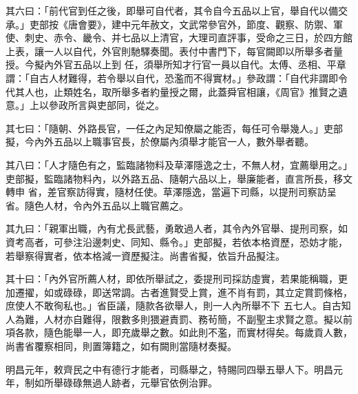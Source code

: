 \begin{pinyinscope}
 其六曰：「前代官到任之後，即舉可自代者，其令自今五品以上官，舉自代以備交承。」吏部按《唐會要》，建中元年赦文，文武常參官外，節度、觀察、防禦、軍使、刺史、赤令、畿令、并七品以上清官，大理司直評事，受命之三日，於四方館上表，讓一人以自代，外官則馳驛奏聞。表付中書門下，每官闕即以所舉多者量授。今擬內外官五品以上到
 任，須舉所知才行官一員以自代。太傅、丞相、平章謂：「自古人材難得，若令舉以自代，恐濫而不得實材。」參政謂：「自代非謂即令代其人也，止類姓名，取所舉多者約量授之爾，此蓋舜官相讓，《周官》推賢之遺意。」上以參政所言與吏部同，從之。



 其七曰：「隨朝、外路長官，一任之內足知僚屬之能否，每任可令舉幾人。」吏部擬，今內外五品以上職事官長，於僚屬內須舉才能官一人，數外舉者聽。



 其八曰：「人才隨色有之，監臨諸物料及草澤隱逸之士，不無人材，宜薦舉用之。」吏部擬，監臨諸物料內，以外路五品、隨朝六品以上，舉廉能者，直言所長，移文轉申
 省，差官察訪得實，隨材任使。草澤隱逸，當遍下司縣，以提刑司察訪呈省。隨色人材，令內外五品以上職官薦之。



 其九曰：「親軍出職，內有尤長武藝，勇敢過人者，其令內外官舉、提刑司察，如資考高者，可參注沿邊刺史、同知、縣令。」吏部擬，若依本格資歷，恐妨才能，若舉察得實者，依本格減一資歷擬注。尚書省擬，依旨升品擬注。



 其十曰：「內外官所薦人材，即依所舉試之，委提刑司採訪虛實，若果能稱職，更加遷擢，如或碌碌，即送常調。古者進賢受上賞，進不肖有罰，其立定賞罰條格，庶使人不敢徇私也。」省臣議，隨款各欲舉人，則一人內所舉不下
 五七人。自古知人為難，人材亦自難得，限數多則猥避責罰、務茍簡，不副聖主求賢之意。擬以前項各款，隨色能舉一人，即充歲舉之數。如此則不濫，而實材得矣。每歲貢人數，尚書省覆察相同，則置簿籍之，如有闕則當隨材奏擬。



 明昌元年，敕齊民之中有德行才能者，司縣舉之，特賜同四舉五舉人下。明昌元年，制如所舉碌碌無過人跡者，元舉官依例治罪。




\end{pinyinscope}
